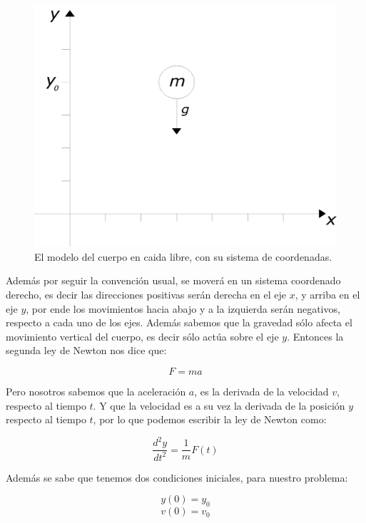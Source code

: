 \begin{figure}
 \centering
 \includegraphics[]{Img/cuerpo_caida}
 \caption[Diagrama de cuerpo libre]{ 
 El modelo del cuerpo en caida libre, con su sistema de coordenadas.
 } \label{cida:fig}
\end{figure}

Además por seguir la convención usual, se moverá en un sistema coordenado derecho, es decir las direcciones positivas serán derecha en el eje $x$, y arriba en el eje $y$, por ende los movimientos hacia abajo y a la izquierda serán negativos, respecto a cada uno de los ejes. Además sabemos que la gravedad sólo afecta el movimiento vertical del cuerpo, es decir sólo actúa sobre el eje $y$. Entonces la segunda ley de Newton nos dice que:

\begin{equation} 
F = m a
\end{equation} 

Pero nosotros sabemos que la aceleración $a$, es la derivada de la velocidad $v$, respecto al tiempo $t$. Y que la velocidad es a su vez la derivada de la posición $y$ respecto al tiempo $t$, por lo que podemos escribir la ley de Newton como:

\begin{equation}
\label{ley:Newton}
 \frac{d^2y}{dt^2} = \frac{1}{m}F(t)
\end{equation}

Además se sabe que tenemos dos condiciones iniciales, para nuestro problema:

$$ y(0) = y_0 $$
$$ v(0) = v_0 $$

